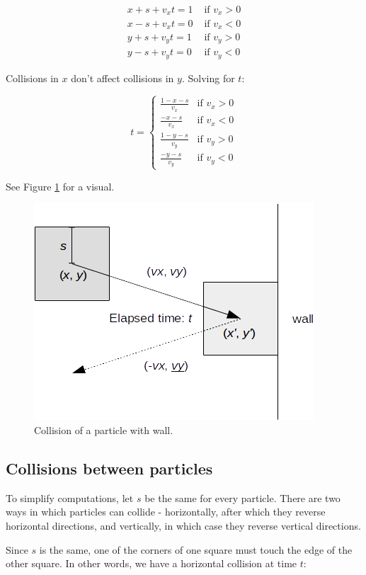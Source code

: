 \documentclass{article}
\begin{document}
\begin{align*}
x+s+v_xt=1 & \text{ if } v_x > 0 \\
x-s+v_xt=0 & \text{ if } v_x < 0 \\
y+s+v_yt=1 & \text{ if } v_y > 0 \\
y-s+v_yt=0 & \text{ if } v_y < 0 
\end{align*}

Collisions in $x$ don't affect collisions in $y$.  Solving for $t$:

\[t=
\begin{cases}
\frac{1-x-s}{v_x} & \text{if } v_x > 0 \\
\frac{-x-s}{v_x} & \text{if } v_x < 0 \\
\frac{1-y-s}{v_y} & \text{if } v_y > 0 \\
\frac{-y-s}{v_y} & \text{if } v_y < 0 
\end{cases}
\]

See Figure \ref{particle-wall} for a visual.

\begin{figure}
\centering
\includegraphics[scale=0.75]{img/particle-wall.png}
\caption{Collision of a particle with wall.  \label{particle-wall}}
\end{figure}

\subsection{Collisions between particles}
To simplify computations, let $s$ be the same for every particle.  There are two ways in which particles can collide - horizontally, after which they reverse horizontal directions, and vertically, in which case they reverse vertical directions.

Since $s$ is the same, one of the corners of one square must touch the edge of the other square.  In other words, we have a horizontal collision at time $t$:
\end{document}
